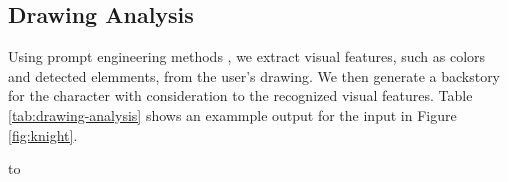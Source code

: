 \documentclass[submit,techrep,english]{ipsj}
\begin{document}
\subsection{Drawing Analysis}
\label{subsec:drawing-analysis}
Using prompt engineering methods \cite{22:abs-2302-11382}, we extract visual features, such as colors and detected elemments, from the user's drawing. We then generate a backstory for the character with consideration to the recognized visual features. Table \ref{tab:drawing-analysis} shows an exammple output for the input in Figure \ref{fig:knight}.

\begin{table}[h]
    \centering
    \caption{Sample of drawing analysis output.}
    \label{tab:drawing-analysis}
    \hbox to
\end{table}
\end{document}
